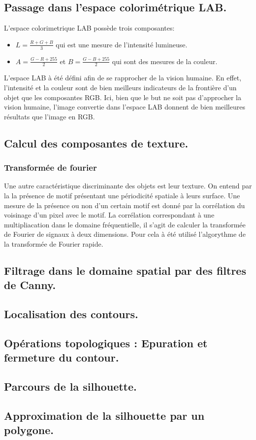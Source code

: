 \documentclass[twocolumn]{article}
\begin{document}
\subsection{Passage dans l'espace colorimétrique LAB.}
L'espace colorimetrique LAB possède trois composantes:
\begin{itemize}
	\item $L = \frac{R + G + B}{3}$ \;\;\;\;\; qui est une mesure de l'intensité lumineuse.
	\item $A = \frac{G - R + 255}{2}$ et $B = \frac{G - B + 255}{2}$ qui sont des mesures de la couleur.
\end{itemize}
L'espace LAB à été défini afin de se rapprocher de la vision humaine. En effet, l'intensité et la couleur sont de bien meilleurs indicateurs de la frontière d'un objet que les composantes RGB. Ici, bien que le but ne soit pas d'approcher la vision humaine, l'image convertie dans l'espace LAB donnent de bien meilleures résultats que l'image en RGB.

\subsection{Calcul des composantes de texture.}
\subsubsection{Transformée de fourier}
Une autre caractéristique discriminante des objets est leur texture. On entend par la la présence de motif présentant une périodicité spatiale à leurs surface. Une mesure de la présence ou non d'un certain motif est donné par la corrélation du voisinage d'un pixel avec le motif. La corrélation correspondant à une multipliacation dans le domaine fréquentielle, il s'agit de calculer la transformée de Fourier de signaux à deux dimensions. Pour cela à été utilisé l'algorythme de la transformée de Fourier rapide.

\subsection{Filtrage dans le domaine spatial par des filtres de Canny.}
\subsection{Localisation des contours.}
\subsection{Opérations topologiques : Epuration et fermeture du contour.}
\subsection{Parcours de la silhouette.}
\subsection{Approximation de la silhouette par un polygone.}
\end{document}
